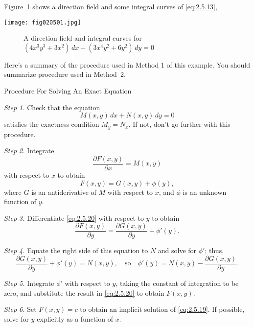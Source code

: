 \documentclass{ximera}
\begin{document}
\begin{example}
\begin{explanation}
Figure~\ref{figure:2.5.1} shows a direction field and  some
integral curves of \eqref{eq:2.5.13},
 
\begin{image}
  \texttt{[image: fig020501.jpg]} \end{image}
\begin{center}
\begin{figure}
   \caption{A direction field and  integral curves for
$(4x^3y^3+3x^2)\,dx+(3x^4y^2+6y^2)\,dy=0$}
  \label{figure:2.5.1}
\end{figure}
\end{center}
\end{explanation}
\end{example}
 
 
Here's a summary of the procedure used in Method 1 of this
example. You should summarize procedure used in Method~2.
 
 
Procedure For Solving An Exact
Equation
 
 
\begin{procedure}\label{proc:solvingExactEq}
 
\textit{Step 1.} Check that the equation
\begin{equation} \label{eq:2.5.19}
 M(x,y)\,dx+N(x,y)\,dy=0
\end{equation}
satisfies the exactness condition  $M_y=N_x$. If not,
don't go further with this procedure.
 
\textit{Step 2.} Integrate
$$
\frac{\partial F(x,y)}{\partial x}=M(x,y)
$$
with respect to $x$ to obtain
\begin{equation} \label{eq:2.5.20}
F(x,y)=G(x,y)+\phi(y),
\end{equation}
where $G$ is an antiderivative of $M$ with respect to $x$, and $\phi$
is an unknown function of $y$.
 
\textit{Step 3.} Differentiate \eqref{eq:2.5.20} with respect to
$y$  to obtain
$$
\frac{\partial F(x,y)}{\partial y}=\frac{\partial G(x,y)}{\partial
y}+\phi'(y).
$$
 
\textit{Step 4.} Equate the right side of this equation to $N$ and solve
for $\phi'$;    thus,
$$
 \frac{\partial G(x,y)}{\partial y}+\phi'(y)=N(x,y),\quad\text{so}\quad
\phi'(y)=N(x,y)-\frac{\partial G(x,y)}{\partial y}.
$$
 
\textit{Step 5.} Integrate $\phi'$ with respect to $y$, taking the
constant of integration to be zero, and substitute the result in
\eqref{eq:2.5.20} to obtain $F(x,y)$.
 
\textit{Step 6.} Set $F(x,y)=c$ to obtain an implicit solution of
\eqref{eq:2.5.19}. If possible, solve for $y$ explicitly as a
function of $x$.
 
\end{procedure}
 
\end{document}
